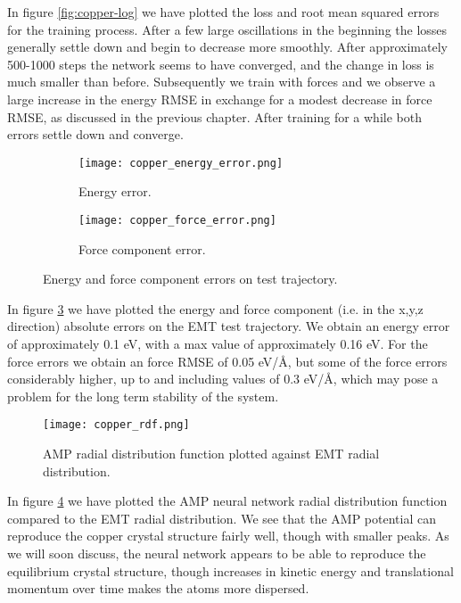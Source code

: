 In figure \ref{fig:copper-log} we have plotted the loss and root mean
squared errors for the training process.
After a few large oscillations in the beginning
the losses generally settle down and begin to decrease
more smoothly.
After approximately 500-1000 steps the network seems to have
converged, and the change in loss is much smaller than before.
Subsequently we train with forces and we observe a large increase
in the energy RMSE in exchange for a modest decrease in force RMSE,
as discussed in the previous chapter.
After training for a while both errors settle down
and converge.

\begin{figure}[H]
\begin{adjustbox}{max width=1.2\linewidth,center}
\centering
  \begin{subfigure}[b]{0.55\textwidth}
      \texttt{[image: copper\_energy\_error.png]}
      \caption{Energy error.}
    \label{fig:f1}
  \end{subfigure}
  \hfill
  \begin{subfigure}[b]{0.55\textwidth}
      \texttt{[image: copper\_force\_error.png]}
      \caption{Force component error.}
    \label{fig:f2}
  \end{subfigure}
\end{adjustbox}
    \caption{Energy and force component errors on test trajectory.}
    \label{fig:copper_error}
\end{figure}

In figure \ref{fig:copper_error} we have plotted the energy and force component
(i.e. in the x,y,z direction)
absolute errors on the EMT test trajectory. We obtain an energy error
of approximately 0.1 eV, with a max value of approximately 0.16 eV.
For the force errors we obtain an force RMSE of 0.05 eV/Å,
but some of the force errors considerably higher, up to
and including values of 0.3 eV/Å, which may pose
a problem for the long term stability of the system.

\begin{figure}[H]
    \centering
    \texttt{[image: copper\_rdf.png]}
    \caption{AMP radial distribution function plotted against
        EMT radial distribution.}
    \label{fig:copper-rdf}
\end{figure}

In figure \ref{fig:copper-rdf} we have plotted the AMP neural network
radial distribution function compared to the EMT radial distribution.
We see that the AMP potential can reproduce the copper crystal
structure fairly well, though with smaller peaks.
As we will soon discuss, the neural network appears
to be able to reproduce the equilibrium crystal structure,
though increases in kinetic energy and translational momentum over time
makes the atoms more dispersed.

